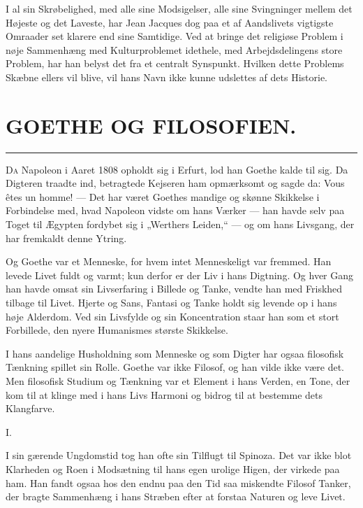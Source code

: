 \documentclass[12pt,a4paper,openany]{book}
\newcommand{\opage}[1]{\marginnote{\footnotesize\textit{[#1]}}}
\newcommand{\essay}[2][]{\chapter*{#2}\addcontentsline{toc}{chapter}{#1}}   %
\newcommand{\streg}{\begin{center}\rule{3em}{0.4pt}\end{center}}
\begin{document}
I al sin Skrøbelighed, med alle sine Modsigelser, alle sine
Svingninger mellem det Højeste og det Laveste, har Jean Jacques
dog paa et af Aandslivets vigtigste Omraader set klarere end
sine Samtidige. Ved at bringe det religiøse Problem i nøje
Sammenhæng med Kulturproblemet idethele, med Arbejdsdelingens
store Problem, har han belyst det fra et centralt Synspunkt.
Hvilken dette Problems Skæbne ellers vil blive, vil
hans Navn ikke kunne udslettes af dets Historie.

\setcounter{footnote}{0}%
\opage{162}\essay[Goethe og Filosofien (1907)]{GOETHE OG FILOSOFIEN.}
\streg

D\textsc{a} Napoleon i Aaret 1808 opholdt sig i Erfurt, lod han
Goethe kalde til sig. Da Digteren traadte ind, betragtede
Kejseren ham opmærksomt og sagde da: Vous êtes un
homme! --- Det har været Goethes mandige og skønne Skikkelse
i Forbindelse med, hvad Napoleon vidste om hans Værker
--- han havde selv paa Toget til Ægypten fordybet sig i
„Werthers Leiden,“ --- og om hans Livsgang, der har fremkaldt
denne Ytring.

Og Goethe var et Menneske, for hvem intet Menneskeligt
var fremmed. Han levede Livet fuldt og varmt; kun derfor er
der Liv i hans Digtning. Og hver Gang han havde omsat sin
Livserfaring i Billede og Tanke, vendte han med Friskhed tilbage
til Livet. Hjerte og Sans, Fantasi og Tanke holdt sig
levende op i hans høje Alderdom. Ved sin Livsfylde og sin
Koncentration staar han som et stort Forbillede, den nyere
Humanismes største Skikkelse.

I hans aandelige Husholdning som Menneske og som Digter
har ogsaa filosofisk Tænkning spillet sin Rolle. Goethe var
ikke Filosof, og han vilde ikke være det. Men filosofisk Studium
og Tænkning var et Element i hans Verden, en Tone,
der kom til at klinge med i hans Livs Harmoni og bidrog til
at bestemme dets Klangfarve.

\begin{center}I.\end{center}


I sin gærende Ungdomstid tog han ofte sin Tilflugt til
Spinoza. Det var ikke blot Klarheden og Roen i Modsætning
\setcounter{footnote}{0}%
\opage{163}til hans egen urolige Higen, der virkede paa ham. Han fandt
ogsaa hos den endnu paa den Tid saa miskendte Filosof Tanker,
der bragte Sammenhæng i hans Stræben efter at forstaa Naturen
og leve Livet.
\end{document}
